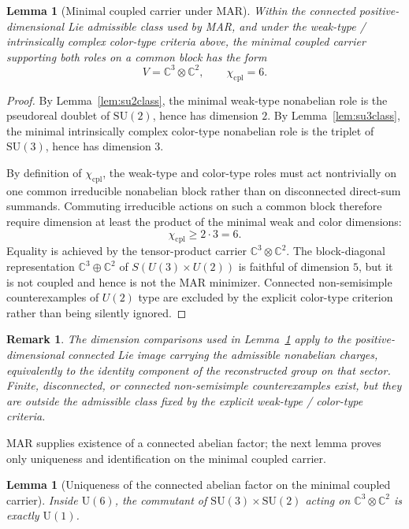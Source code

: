 \documentclass[11pt]{article}
\newtheorem{lemma}[theorem]{Lemma}
\newtheorem{remark}[theorem]{Remark}
\newcommand{\SU}{\mathrm{SU}}
\newcommand{\U}{\mathrm{U}}
\begin{document}
\begin{lemma}[Minimal coupled carrier under MAR]\label{lem:carrier}
Within the connected positive-dimensional Lie admissible class used by MAR, and under the weak-type / intrinsically complex color-type criteria above, the minimal coupled carrier supporting both roles on a common block has the form
\[
V=\mathbb C^3\otimes \mathbb C^2,
\qquad
\chi_{\mathrm{cpl}}=6.
\]
\end{lemma}

\begin{proof}
By Lemma~\ref{lem:su2class}, the minimal weak-type nonabelian role is the pseudoreal doublet of $\SU(2)$, hence has dimension $2$. By Lemma~\ref{lem:su3class}, the minimal intrinsically complex color-type nonabelian role is the triplet of $\SU(3)$, hence has dimension $3$.

By definition of $\chi_{\mathrm{cpl}}$, the weak-type and color-type roles must act nontrivially on one common irreducible nonabelian block rather than on disconnected direct-sum summands. Commuting irreducible actions on such a common block therefore require dimension at least the product of the minimal weak and color dimensions:
\[
\chi_{\mathrm{cpl}}\ge 2\cdot 3=6.
\]
Equality is achieved by the tensor-product carrier $\mathbb C^3\otimes\mathbb C^2$. The block-diagonal representation $\mathbb C^3\oplus \mathbb C^2$ of $S(U(3)\times U(2))$ is faithful of dimension $5$, but it is not coupled and hence is not the MAR minimizer. Connected non-semisimple counterexamples of $U(2)$ type are excluded by the explicit color-type criterion rather than being silently ignored.
\end{proof}

\begin{remark}\label{rem:connectedlie}
The dimension comparisons used in Lemma~\ref{lem:carrier} apply to the positive-dimensional connected Lie image carrying the admissible nonabelian charges, equivalently to the identity component of the reconstructed group on that sector. Finite, disconnected, or connected non-semisimple counterexamples exist, but they are outside the admissible class fixed by the explicit weak-type / color-type criteria.
\end{remark}

MAR supplies existence of a connected abelian factor; the next lemma proves only uniqueness and identification on the minimal coupled carrier.

\begin{lemma}[Uniqueness of the connected abelian factor on the minimal coupled carrier]\label{lem:commutant}
Inside $\U(6)$, the commutant of $\SU(3)\times\SU(2)$ acting on $\mathbb C^3\otimes \mathbb C^2$ is exactly $\U(1)$.
\end{lemma}
\end{document}
